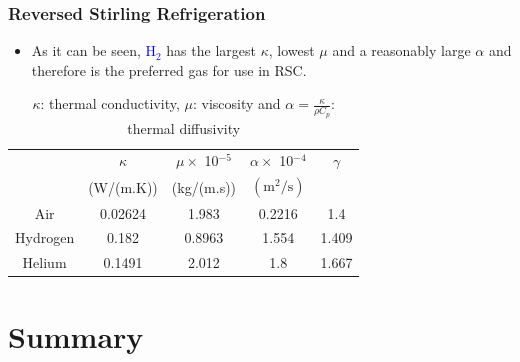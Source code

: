 \documentclass[10pt,compress]{beamer}
\newcommand{\frc}{\displaystyle\frac}
\begin{document}
\begin{frame}
 \frametitle{Reversed Stirling Refrigeration}
  \begin{itemize}
   \item <2-> As it can be seen, \textcolor{blue}{H$_{2}$} has the largest $\kappa$, lowest $\mu$ and a reasonably large $\alpha$ and therefore is the preferred gas for use in RSC.
  \end{itemize}

 \begin{center}
 \begin{table}
  \begin{tabular}{c c c c c}
      \hline
                 &  $\kappa$   &  $\mu\times$ 10$^{-5}$ &  $\alpha \times$ 10$^{-4}$   & $\gamma$   \\
                 & (W/(m.K))   &  (kg/(m.s))           &  $\left(\text{m}^{2}/\text{s}\right)$ & \\
       \hline
       Air       & 0.02624     & 1.983                 & 0.2216        & 1.4 \\
      Hydrogen   &  0.182      & 0.8963                & 1.554         & 1.409  \\
     Helium      &  0.1491     & 2.012                 & 1.8           & 1.667 \\
   \hline            
  \end{tabular}
  \caption{$\kappa$: thermal conductivity, $\mu$: viscosity and $\alpha=\frc{\kappa}{\rho C_{p}}$: thermal diffusivity }
 \end{table}
\end{center}
\end{frame}



\section{Summary}
\end{document}
